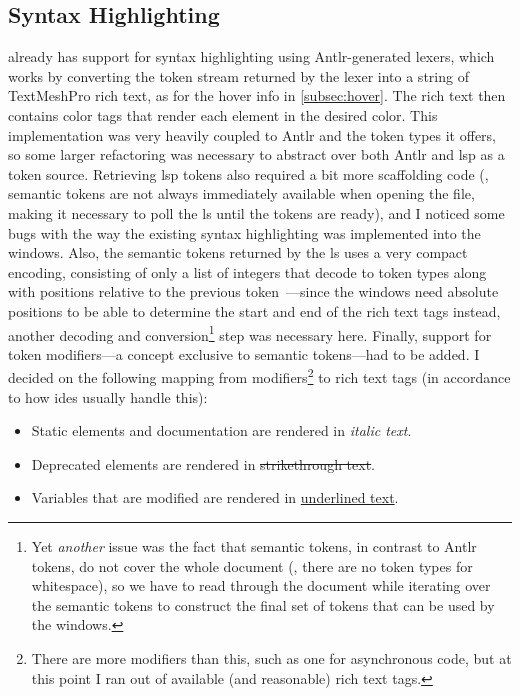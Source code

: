 \documentclass[../thesis]{subfiles}
\begin{document}
\subsection{Syntax Highlighting}
\SEE{} already has support for syntax highlighting using Antlr-generated lexers, which works by converting the token stream returned by the lexer into a string of TextMeshPro rich text, as for the hover info in \cref{subsec:hover}.
The rich text then contains color tags that render each element in the desired color.
This implementation was very heavily coupled to Antlr and the token types it offers, so some larger refactoring was necessary to abstract over both Antlr and \gls{lsp} as a token source.
Retrieving \gls{lsp} tokens also required a bit more scaffolding code (\eg, semantic tokens are not always immediately available when opening the file, making it necessary to poll the \gls{ls} until the tokens are ready), and I noticed some bugs with the way the existing syntax highlighting was implemented into the \glspl{window}.
Also, the semantic tokens returned by the \gls{ls} uses a very compact encoding, consisting of only a list of integers that decode to token types along with positions relative to the previous token~\cite{lsp}---since the \glspl{window} need absolute positions to be able to determine the start and end of the rich text tags instead, another decoding and conversion\footnote{
	Yet \emph{another} issue was the fact that semantic tokens, in contrast to Antlr tokens, do not cover the whole document (\eg, there are no token types for whitespace), so we have to read through the document while iterating over the semantic tokens to construct the final set of tokens that can be used by the \glspl{window}.
} step was necessary here.
Finally, support for token modifiers---a concept exclusive to semantic tokens---had to be added.
I decided on the following mapping from modifiers\footnote{
	There are more modifiers than this, such as one for asynchronous code, but at this point I ran out of available (and reasonable) rich text tags.
} to rich text tags (in accordance to how \glspl{ide} usually handle this):
\begin{itemize}
	\item Static elements and documentation are rendered in \textit{italic text}.
	\item Deprecated elements are rendered in \st{strikethrough text}.
	\item Variables that are modified are rendered in \underline{underlined text}.
\end{itemize}
\end{document}
